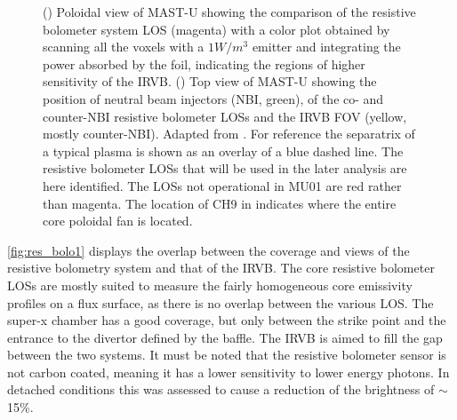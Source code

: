 \begin{figure}[!ht]
\begin{subfigure}{0.48\linewidth}
         \caption{}
         \label{fig:res_bolo1b}
     \end{subfigure}
	\caption{() Poloidal view of MAST-U showing the comparison of the resistive bolometer system LOS (magenta) with a color plot obtained by scanning all the voxels with a $1W/m^3$ emitter and integrating the power absorbed by the foil, indicating the regions of higher sensitivity of the IRVB. () Top view of MAST-U showing the position of neutral beam injectors (NBI, green), of the co- and counter-NBI resistive bolometer LOSs and the IRVB FOV (yellow, mostly counter-NBI). Adapted from \cite{Rivero-Rodriguez2018}. For reference the separatrix of a typical plasma is shown as an overlay of a blue dashed line. The resistive bolometer LOSs that will be used in the later analysis are here identified. The LOSs not operational in MU01 are red rather than magenta. The location of CH9 in  indicates where the entire core poloidal fan is located.}
    \label{fig:res_bolo1}
\end{figure}


\autoref{fig:res_bolo1} displays the overlap between the coverage and views of the resistive bolometry system and that of the IRVB. The core resistive bolometer LOSs are mostly suited to measure the fairly homogeneous core emissivity profiles on a flux surface, as there is no overlap between the various LOS. The super-x chamber has a good coverage, but only between the  strike point and the entrance to the divertor defined by the baffle. The IRVB is aimed to fill the gap between the two systems. It must be noted that the resistive bolometer sensor is not carbon coated, meaning it has a lower sensitivity to lower energy photons.\cite{VanEden2018} In detached conditions this was assessed to cause a reduction of the brightness of $\sim$15\%.\cite{Sheikh2016}

